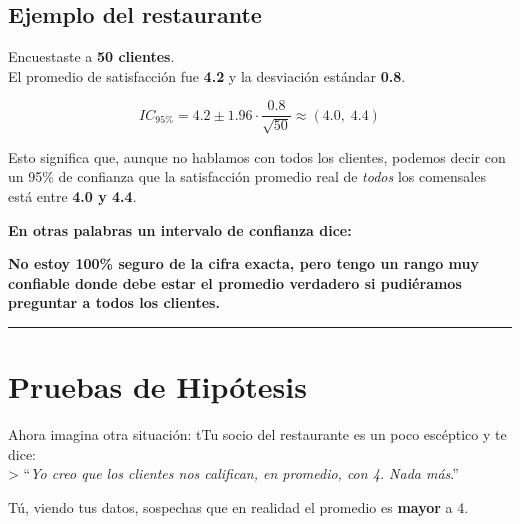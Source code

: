 \documentclass[
  spanish,
  letterpaper,
  DIV=11,
  numbers=noendperiod]{scrreprt}
\begin{document}
\subsection{Ejemplo del restaurante}\label{ejemplo-del-restaurante}

Encuestaste a \textbf{50 clientes}.\\
El promedio de satisfacción fue \textbf{4.2} y la desviación estándar
\textbf{0.8}.

\[
IC_{95\%} = 4.2 \pm 1.96 \cdot \frac{0.8}{\sqrt{50}} \approx (4.0,\;4.4)
\]

Esto significa que, aunque no hablamos con todos los clientes, podemos
decir con un 95\% de confianza que la satisfacción promedio real de
\emph{todos} los comensales está entre \textbf{4.0 y 4.4}.

\begin{tcolorbox}[enhanced jigsaw, toptitle=1mm, opacitybacktitle=0.6, leftrule=.75mm, arc=.35mm, title=\textcolor{quarto-callout-tip-color}{\faLightbulb}\hspace{0.5em}{Tip}, colback=white, bottomrule=.15mm, colbacktitle=quarto-callout-tip-color!10!white, opacityback=0, bottomtitle=1mm, breakable, rightrule=.15mm, coltitle=black, left=2mm, titlerule=0mm, colframe=quarto-callout-tip-color-frame, toprule=.15mm]

\textbf{En otras palabras un intervalo de confianza dice:}

\textbf{No estoy 100\% seguro de la cifra exacta, pero tengo un rango
muy confiable donde debe estar el promedio verdadero si pudiéramos
preguntar a todos los clientes.}

\end{tcolorbox}

\begin{center}\rule{0.5\linewidth}{0.5pt}\end{center}

\section{Pruebas de Hipótesis}\label{pruebas-de-hipuxf3tesis}

Ahora imagina otra situación: tTu socio del restaurante es un poco
escéptico y te dice:\\
\textgreater{} ``\emph{Yo creo que los clientes nos califican, en
promedio, con 4. Nada más}.''

Tú, viendo tus datos, sospechas que en realidad el promedio es
\textbf{mayor} a 4.
\end{document}
